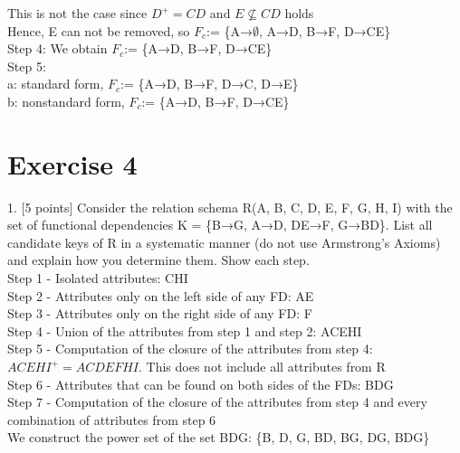 \documentclass[]{article}
\begin{document}
	This is not the case since $D^{+} = CD$ and $E\not\subseteq CD$ holds  \\
	
	Hence, E can not be removed, so $F_{c}$:= \{A→$\emptyset$, A→D, B→F, D→CE\} \\
	
	\noindent Step 4: We obtain $F_{c}$:= \{A→D, B→F, D→CE\} \\
	
	\noindent Step 5:  \\
	
	a: standard form, $F_{c}$:= \{A→D, B→F, D→C, D→E\}  \\
	
	b: nonstandard form, $F_{c}$:= \{A→D, B→F, D→CE\} \\
	
	\section{Exercise 4}
	
	1. [5 points] Consider the relation schema R(A, B, C, D, E, F, G, H, I) with the set of functional dependencies K = \{B→G, A→D, DE→F, G→BD\}. List all candidate keys of R in a systematic manner (do not use Armstrong’s Axioms) and explain how you determine them. Show each step.      \\
	
	Step 1 - Isolated attributes: CHI  \\
	
	Step 2 - Attributes only on the left side of any FD: AE   \\
	
	Step 3 - Attributes only on the right side of any FD: F     \\
	
	Step 4 - Union of the attributes from step 1 and step 2: ACEHI   \\
	
	Step 5 - Computation of the closure of the attributes from step 4: $ACEHI^{+} = ACDEFHI$. This does not include all attributes from R  \\
	
	Step 6 - Attributes that can be found on both sides of the FDs: BDG   \\
	
	Step 7 - Computation of the closure of the attributes from step 4 and every combination of attributes from step 6   \\
	
	We construct the power set of the set BDG: \{B, D, G, BD, BG, DG, BDG\}  \\
	
\end{document}
